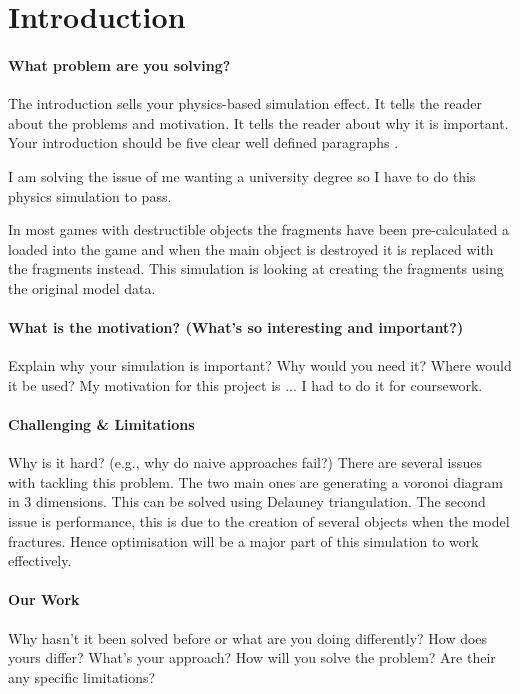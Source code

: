 \documentclass[conference,backref=page]{acmsiggraph}
\begin{document}



\section{Introduction}


\paragraph{What problem are you solving?}
The introduction sells your physics-based simulation effect.  It tells the reader about the problems and motivation.  It tells the reader about why it is important.  Your introduction should be five clear well defined paragraphs \cite{day2012write}.

I am solving the issue of me wanting a university degree so I have to do this physics simulation to pass.

In most games with destructible objects the fragments have been pre-calculated a loaded into the game and when the main object is destroyed it is replaced with the fragments instead. This simulation is looking at creating the fragments using the original model data. 



\paragraph{What is the motivation? (What's so interesting and important?)}
Explain why your simulation is important?  Why would you need it?  Where would it be used?
My motivation for this project is ... I had to do it for coursework.

\paragraph{Challenging \& Limitations}
Why is it hard? (e.g., why do naive approaches fail?)
There are several issues with tackling this problem. The two main ones are generating a voronoi diagram in 3 dimensions. This can be solved using Delauney triangulation. The second issue is performance, this is due to the creation of several objects when the model fractures. Hence optimisation will be a major part of this simulation to work effectively.


\paragraph{Our Work}
Why hasn't it been solved before or what are you doing differently? How does yours differ?
What's your approach?  How will you solve the problem?  Are their any specific limitations?
\end{document}
